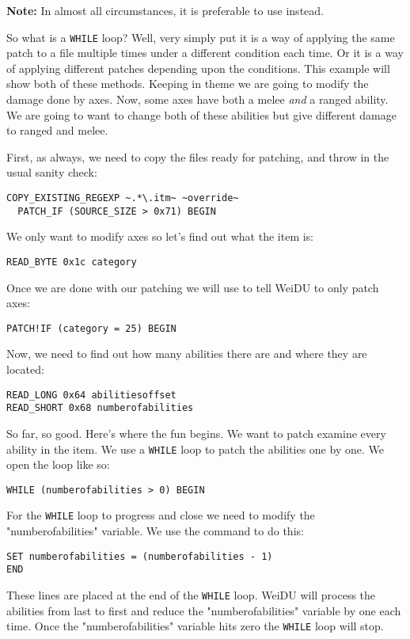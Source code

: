 \documentclass{article}
\def\ttref#1{\ahrefloc{#1}{\tt #1}}
\def\t#1{{\tt #1}}
\begin{document}
\textbf{Note:} In almost all circumstances, it is preferable to use \ttref{FOR}
instead.

So what is a \t{WHILE} loop? Well, very simply put it is a way of
applying the same patch to a file multiple times under a different
condition each time. Or it is a way of applying different patches depending
upon the conditions. This example will show both of these methods. Keeping
in theme we are going to modify the damage done by axes. Now, some axes
have both a melee \emph{and} a ranged ability. We are going to want to
change both of these abilities but give different damage to ranged and
melee.


First, as always, we need to copy the files ready for patching, and throw
in the usual sanity check:
\begin{verbatim}
COPY_EXISTING_REGEXP ~.*\.itm~ ~override~
  PATCH_IF (SOURCE_SIZE > 0x71) BEGIN
\end{verbatim}
We only want to modify axes so let's find out what the item is:
\begin{verbatim}
READ_BYTE 0x1c category
\end{verbatim}
Once we are done with our patching we will use \ttref{PATCH!IF} to tell
WeiDU to only patch axes:

\begin{verbatim}
PATCH!IF (category = 25) BEGIN
\end{verbatim}
Now, we need to find out how many abilities there are and where they are
located:
\begin{verbatim}
READ_LONG 0x64 abilitiesoffset
READ_SHORT 0x68 numberofabilities
\end{verbatim}
So far, so good. Here's where the fun begins. We want to patch examine
every ability in the item. We use a \t{WHILE} loop to patch the
abilities one by one. We open the loop like so:
\begin{verbatim}
WHILE (numberofabilities > 0) BEGIN
\end{verbatim}
For the \t{WHILE} loop to progress and close we need to modify the
"numberofabilities" variable. We use the \ttref{SET} command to do this:

\begin{verbatim}
SET numberofabilities = (numberofabilities - 1)
END
\end{verbatim}
These lines are placed at the end of the \t{WHILE} loop. WeiDU will
process the abilities from last to first and reduce the "numberofabilities"
variable by one each time. Once the "numberofabilities" variable hits zero the
\t{WHILE} loop will stop.
\end{document}
